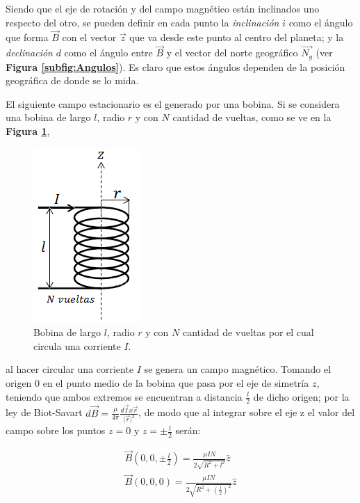 \documentclass[11pt,a4paper]{article}
\begin{document}
Siendo que el eje de rotación y del campo magnético están inclinados uno respecto del otro, se pueden definir en cada punto la \textit{inclinación} $i$ como el ángulo que forma $\vec{B}$ con el vector $\vec{z}$ que va desde este punto al centro del planeta; y la \textit{declinación} $d$ como el ángulo entre $\vec{B}$ y el vector del norte geográfico $\vec{N_g}$ (ver \textbf{ Figura \ref{subfig:Angulos}}). Es claro que estos ángulos dependen de la posición geográfica de donde se lo mida.

\bigskip
El siguiente campo estacionario es el generado por una bobina. Si se considera una bobina de largo $l$, radio $r$ y con $N$ cantidad de vueltas, como se ve en la \textbf{Figura \ref{fig:bobina_intro}},

\begin{figure}[h]

\centering
\includegraphics[scale=1]{bobina.png}
	\caption{Bobina de largo $l$, radio $r$ y con $N$ cantidad de vueltas por el cual circula una corriente $I$.}
	\label{fig:bobina_intro}
\end{figure}

al hacer circular una corriente $I$ se genera un campo magnético. Tomando el origen $0$ en el punto medio de la bobina que pasa por el eje de simetría $z$, teniendo que ambos extremos se encuentran a distancia $\frac{l}{2}$ de dicho origen; por la ley de Biot-Savart $d\vec{B}=\frac{\mu}{4\pi}\frac{d\vec{I}x\vec{r}}{\vert\vec{r}\vert^3}$, de modo que al integrar sobre el eje z el valor del campo sobre los puntos $z=0$ y $z=\pm \frac{l}{2}$ serán:

\begin{equation}
\begin{split}
\vec{B}(0,0, \pm \frac{l}{2})= \frac{\mu I N}{2\sqrt{R^2+l^2}}\hat{z}\\
\vec{B}(0,0,0)= \frac{\mu I N}{2\sqrt{R^2+(\frac{l}{2})^2}}\hat{z}
\end{split}
\label{eq:valores_B}
\end{equation}
\end{document}

